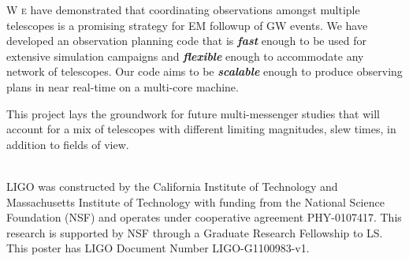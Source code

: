 \documentclass[landscape]{a0poster}
\newcommand{\dropcap}[2]{\lettrine{\fontspec{Copse}#1}{\textnormal{ #2}}}
\renewcommand{\emph}[1]{{\bfseries\itshape#1}}
\begin{document}
\dropcap{W}{e} have demonstrated that coordinating observations amongst multiple telescopes is a promising strategy for EM followup of GW events.  We have developed an observation planning code that is \emph{fast} enough to be used for extensive simulation campaigns and \emph{flexible} enough to accommodate any network of telescopes.  Our code aims to be \emph{scalable} enough to produce observing plans in near real-time on a multi-core machine.

This project lays the groundwork for future multi-messenger studies that will account for a mix of telescopes with different limiting magnitudes, slew times, in addition to fields of view.




\noindent\\
LIGO was constructed by the California Institute of Technology and Massachusetts Institute of Technology with funding from the National Science Foundation (NSF) and operates under cooperative agreement PHY-0107417.  This research is supported by NSF through a Graduate Research Fellowship to LS.  This poster has LIGO Document Number LIGO-G1100983-v1.
\end{document}
